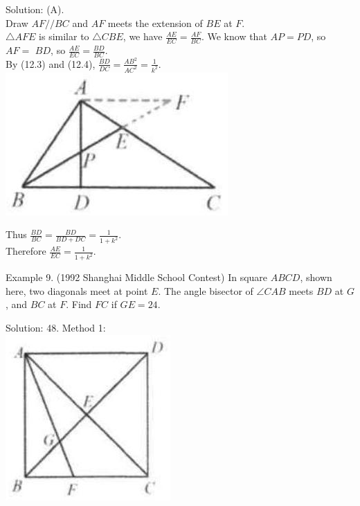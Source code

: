 \documentclass[10pt]{article}
\begin{document}
Solution: (A).\\
Draw \(A F / / B C\) and \(A F\) meets the extension of \(B E\) at \(F\).\\
\(\triangle A F E\) is similar to \(\triangle C B E\), we have \(\frac{A E}{E C}=\frac{A F}{B C}\). We know that \(A P=P D\), so \(A F=\) \(B D\), so \(\frac{A E}{E C}=\frac{B D}{B C}\).\\
By (12.3) and (12.4), \(\frac{B D}{D C}=\frac{A B^{2}}{A C^{2}}=\frac{1}{k^{2}}\).\\
\includegraphics[max width=\textwidth, center]{2025_04_17_97bc1f7e44d93c271a88g-108}

Thus \(\frac{B D}{B C}=\frac{B D}{B D+D C}=\frac{1}{1+k^{2}}\).\\
Therefore \(\frac{A E}{E C}=\frac{1}{1+k^{2}}\).


Example 9. (1992 Shanghai Middle School Contest) In square \(A B C D\), shown here, two diagonals meet at point \(E\). The angle bisector of \(\angle C A B\) meets \(B D\) at \(G\), and \(B C\) at \(F\). Find \(F C\) if \(G E=24\).

Solution: 48.
Method 1:\\
\includegraphics[max width=\textwidth, center]{2025_04_17_97bc1f7e44d93c271a88g-109(2)}
\end{document}
